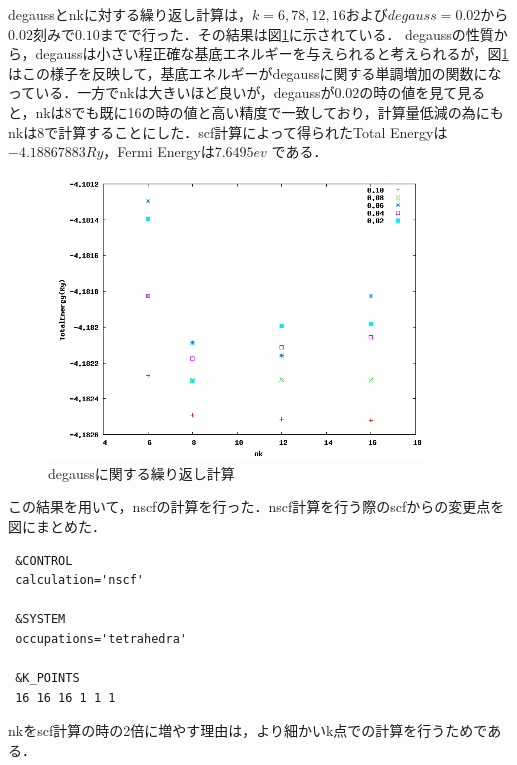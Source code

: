 \documentclass[a4j]{jarticle}
\begin{document}
degaussとnkに対する繰り返し計算は，$k=6,78,12,16$および$degauss=0.02$から$0.02$刻みで$0.10$までで行った．その結果は図\ref{050705_19May19}に示されている．
degaussの性質から，degaussは小さい程正確な基底エネルギーを与えられると考えられるが，図\ref{050705_19May19}はこの様子を反映して，基底エネルギーがdegaussに関する単調増加の関数になっている．一方でnkは大きいほど良いが，degaussが$0.02$の時の値を見て見ると，nkは8でも既に16の時の値と高い精度で一致しており，計算量低減の為にもnkは8で計算することにした．scf計算によって得られたTotal Energyは$-4.18867883 Ry$，Fermi Energyは$7.6495 ev$ である．
\begin{figure}[htb]
 \begin{center}
  \includegraphics[bb=0 0 640 480,width=10cm]{Al.TotalEnergy.png}
  \caption{degaussに関する繰り返し計算}
  \label{050705_19May19}
 \end{center}
\end{figure}


この結果を用いて，nscfの計算を行った．nscf計算を行う際のscfからの変更点を図にまとめた．
\begin{lstlisting}
 &CONTROL
 calculation='nscf'

 &SYSTEM
 occupations='tetrahedra'

 &K_POINTS
 16 16 16 1 1 1
\end{lstlisting}
nkをscf計算の時の2倍に増やす理由は，より細かいk点での計算を行うためである．
\end{document}
